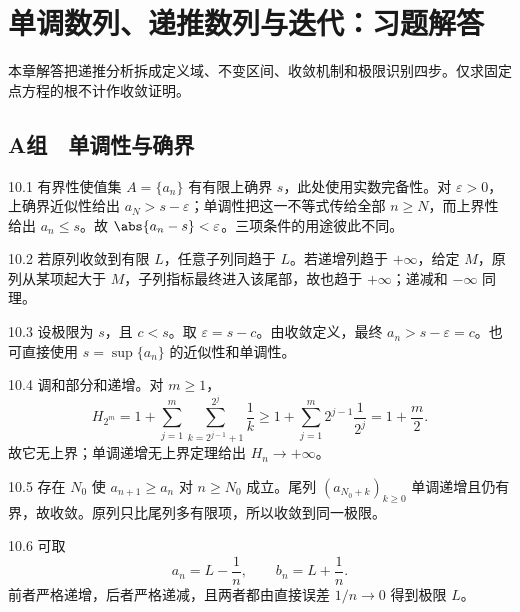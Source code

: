\chapter{单调数列、递推数列与迭代：习题解答}

\begin{chapterguide}
本章解答把递推分析拆成定义域、不变区间、收敛机制和极限识别四步。仅求固定点方程的根不计作收敛证明。
\end{chapterguide}

\section*{A组　单调性与确界}

\begin{solution}{10.1}
有界性使值集 \(A=\{a_n\}\) 有有限上确界 \(s\)，此处使用实数完备性。对 \(\varepsilon>0\)，上确界近似性给出 \(a_N>s-\varepsilon\)；单调性把这一不等式传给全部 \(n\ge N\)，而上界性给出 \(a_n\le s\)。故
\(\abs{a_n-s}<\varepsilon\)。三项条件的用途彼此不同。
\end{solution}

\begin{solution}{10.2}
若原列收敛到有限 \(L\)，任意子列同趋于 \(L\)。若递增列趋于 \(+\infty\)，给定 \(M\)，原列从某项起大于 \(M\)，子列指标最终进入该尾部，故也趋于 \(+\infty\)；递减和 \(-\infty\) 同理。
\end{solution}

\begin{solution}{10.3}
设极限为 \(s\)，且 \(c<s\)。取 \(\varepsilon=s-c\)。由收敛定义，最终
\(a_n>s-\varepsilon=c\)。也可直接使用 \(s=\sup\{a_n\}\) 的近似性和单调性。
\end{solution}

\begin{solution}{10.4}
调和部分和递增。对 \(m\ge1\)，
\[
 H_{2^m}
 =1+\sum_{j=1}^m\sum_{k=2^{j-1}+1}^{2^j}\frac1k
 \ge1+\sum_{j=1}^m2^{j-1}\frac1{2^j}
 =1+\frac m2.
\]
故它无上界；单调递增无上界定理给出 \(H_n\to+\infty\)。
\end{solution}

\begin{solution}{10.5}
存在 \(N_0\) 使 \(a_{n+1}\ge a_n\) 对 \(n\ge N_0\) 成立。尾列 \((a_{N_0+k})_{k\ge0}\) 单调递增且仍有界，故收敛。原列只比尾列多有限项，所以收敛到同一极限。
\end{solution}

\begin{solution}{10.6}
可取
\[
 a_n=L-\frac1n,\qquad b_n=L+\frac1n.
\]
前者严格递增，后者严格递减，且两者都由直接误差 \(1/n\to0\) 得到极限 \(L\)。
\end{solution}

